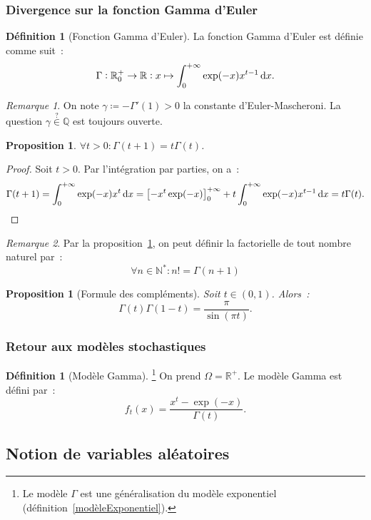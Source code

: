 \documentclass{article}
\newcommand{\N}{\mathbb N}
\newcommand{\Q}{\mathbb Q}
\newcommand{\R}{\mathbb R}
\newtheorem{prp}[thm]{Proposition}
\theoremstyle{definition}
\newtheorem{déf}[thm]{Définition}
\theoremstyle{remark}
\newtheorem*{rmq}{Remarque}
\begin{document}
		\subsubsection{Divergence sur la fonction Gamma d'Euler}

		\begin{déf}[Fonction Gamma d'Euler] La fonction Gamma d'Euler est définie comme suit~:
		\[\Gamma : \R_0^+ \to \R : x \mapsto \int_0^{+\infty}\exp(-x)x^{t-1}\dif x.\] \end{déf}
		
		\begin{rmq} On note $\gamma \coloneqq -\Gamma'(1) > 0$ la constante d'Euler-Mascheroni. La question $\gamma \stackrel{?}{\in} \Q$ est toujours ouverte.
		\end{rmq}

		\begin{prp}\label{GammaRecursif} $\forall t > 0 : \Gamma(t+1) = t\Gamma(t)$. \end{prp}

		\begin{proof} Soit $t > 0$. Par l'intégration par parties, on a~:
		\[\Gamma(t+1) = \int_0^{+\infty}\exp(-x)x^{t}\dif x = \left[-x^t\exp(-x)\right]_0^{+\infty} + t\int_0^{+\infty}\exp(-x)x^{t-1}\dif x = t\Gamma(t).\]
		\end{proof}

		\begin{rmq} Par la proposition~\ref{GammaRecursif}, on peut définir la factorielle de tout nombre naturel par~:
		\[\forall n \in \N^* : n! = \Gamma(n+1)\]
		\end{rmq}

		\begin{prp}[Formule des compléments] Soit $t \in (0, 1)$. Alors~:
		\[\Gamma(t)\Gamma(1-t) = \frac \pi{\sin(\pi t)}.\]
		\end{prp}

		\subsubsection{Retour aux modèles stochastiques}

		\begin{déf}[Modèle Gamma]\footnote{Le modèle $\Gamma$ est une généralisation du modèle exponentiel (définition~\ref{modèleExponentiel}).}
		On prend $\Omega = \R^+$. Le modèle Gamma est défini par~:
		\[f_t(x) = \frac {x^t-\exp(-x)}{\Gamma(t)}.\]
		\end{déf}

	\subsection{Notion de variables aléatoires}
\end{document}
